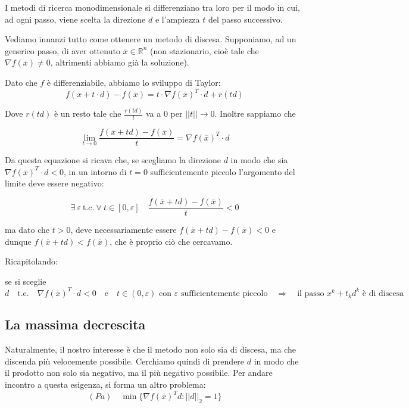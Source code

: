 I metodi di ricerca monodimensionale si differenziano tra loro
per il modo in cui, ad ogni passo, viene scelta la
direzione $d$ e l'ampiezza $t$ del passo successivo.

Vediamo innanzi tutto come ottenere un metodo di discesa. Supponiamo,
ad un generico passo, di aver ottenuto $ \overline{x} \in
\mathbb{R}^{n}$ (non stazionario, cio\`e tale che $\nabla
f(\overline{x}) \neq 0$, altrimenti abbiamo gi\`a la soluzione).

Dato che $f$ \`e differenziabile, abbiamo lo sviluppo di Taylor:
$$f(\overline{x} +t \cdot d) -f(\overline{x}) = t \cdot \nabla f(\overline{x})^{T} \cdot d + r(td)$$

Dove $r(td)$ \`e un resto tale che $\frac{r(td)}{t}$ va a $0$ per $||t|| \longrightarrow 0$. Inoltre
sappiamo che

$$ \lim_{t \to 0} \frac{f(\overline{x}+td)- f(\overline{x})}{t} = \nabla f(\overline{x})^{T} \cdot d $$

Da questa equazione si ricava che, se scegliamo la direzione $d$ in
modo che sia $\nabla f(\overline{x})^{T} \cdot d < 0$, in un intorno
di $t=0$ sufficientemente piccolo l'argomento del limite deve essere
negativo:

$$\exists ~ \varepsilon ~ \text{t.c.}~ \forall ~ t \in [0,\varepsilon] \quad \frac{f(\overline{x}+td)- f(\overline{x})}{t} < 0$$

ma dato che $t>0$, deve necessariamente essere $f(\overline{x}+td)-
f(\overline{x}) < 0$ e dunque $f(\overline{x}+td) < f(\overline{x})$,
che \`e proprio ciò che cercavamo.

Ricapitolando:
\begin{property}
\label{prop:metodo-discesa-gradiente-direzione} se si sceglie
$$d \quad \text{t.c.} \quad \nabla f(\overline{x})^{T} \cdot d < 0 \quad \text{e} \quad  t \in (0, \varepsilon) \text{ con }\varepsilon\text{ sufficientemente piccolo} \quad \Longrightarrow \quad \text{il passo } x^{k} + t_k d^{k} \text{ \`e di discesa} $$
\end{property}
\subsection{La massima decrescita}
\label{subsection:massima-decrescita} Naturalmente, il nostro
interesse \`e che il metodo non solo sia di discesa, ma che discenda pi\`u
velocemente possibile. Cerchiamo quindi di prendere $d$ in modo che il
prodotto non solo sia negativo, ma il pi\`u negativo possibile. Per
andare incontro a questa esigenza, si forma un altro problema:
\begin{equation}
\label{prob:pa} (Pa) \quad \min \{ \nabla f(\overline{x})^{T}d :
||d||_2 = 1 \}
\end{equation}

